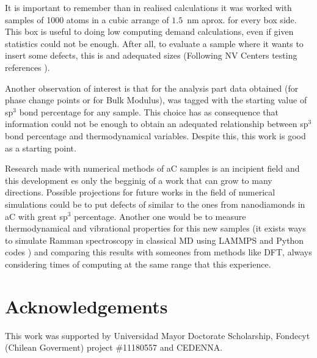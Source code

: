 \documentclass[a4paper,fleqn]{cas-dc}
\begin{document}
It is important to remember than in realised calculations it was worked with samples of 1000 atoms in a cubic arrange of $1.5$~nm  aprox. for every box side. This box is useful to doing low computing demand calculations, even if given statistics could not be enough. After all, to evaluate a sample where it wants to insert some defects, this is and adequated sizes  (Following NV Centers testing references \cite{NVDiamond}). 

Another observation of interest is that for the analysis part data obtained (for phase change points or for Bulk Modulus), was tagged with the starting value of sp$^3$ bond percentage for any sample. This choice has as consequence that information could not be enough to obtain an adequated relationship between sp$^3$ bond percentage and thermodynamical variables. Despite this, this work is good as a starting point.

Research made with numerical methods of aC samples is an incipient field and this development es only the begginig of a work that can grow to many directions. Possible projections for future works in the field of numerical simulations could be to put defects of similar to the ones from nanodiamonds in aC with great sp$^3$ percentage. Another one would be to measure thermodynamical and vibrational properties for this new samples (it exists ways to simulate Ramman spectroscopy in classical MD using LAMMPS and Python codes \cite{Phonopy}) and comparing this results with someones from methods like DFT, always considering times of computing at the same range that this experience.
\section{Acknowledgements}
This work was supported by Universidad Mayor Doctorate Scholarship, Fondecyt (Chilean Goverment) project \#11180557 and CEDENNA.

\nocite{*}

\end{document}

